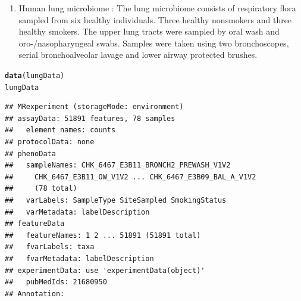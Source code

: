 \documentclass[a4paper,11pt]{article}\usepackage[]{graphicx}\usepackage[]{color}
\makeatletter
\newcommand{\hlstd}[1]{\textcolor[rgb]{0.345,0.345,0.345}{#1}}%
\newcommand{\hlkwd}[1]{\textcolor[rgb]{0.737,0.353,0.396}{\textbf{#1}}}%
\newenvironment{kframe}{%
 \def\at@end@of@kframe{}%
 \ifinner\ifhmode%
  \def\at@end@of@kframe{\end{minipage}}%
  \begin{minipage}{\columnwidth}%
 \fi\fi%
 \def\FrameCommand##1{\hskip\@totalleftmargin \hskip-\fboxsep
 \colorbox{shadecolor}{##1}\hskip-\fboxsep
     \hskip-\linewidth \hskip-\@totalleftmargin \hskip\columnwidth}%
 \MakeFramed {\advance\hsize-\width
   \@totalleftmargin\z@ \linewidth\hsize
   \@setminipage}}%
 {\par\unskip\endMakeFramed%
 \at@end@of@kframe}
\newenvironment{knitrout}{}{} %
\makeatother
\begin{document}
\begin{enumerate}
\item Human lung microbiome \cite{charlson}:
The lung microbiome consists of respiratory flora sampled from six healthy individuals. Three healthy nonsmokers and three healthy smokers. The upper lung tracts were sampled by oral wash and oro-/nasopharyngeal swabs. Samples were taken using two bronchoscopes, serial bronchoalveolar lavage and lower airway protected brushes.
\end{enumerate}
\begin{knitrout}
\color{fgcolor}\begin{kframe}
\begin{alltt}
\hlkwd{data}\hlstd{(lungData)}
\hlstd{lungData}
\end{alltt}
\begin{verbatim}
## MRexperiment (storageMode: environment)
## assayData: 51891 features, 78 samples 
##   element names: counts 
## protocolData: none
## phenoData
##   sampleNames: CHK_6467_E3B11_BRONCH2_PREWASH_V1V2
##     CHK_6467_E3B11_OW_V1V2 ... CHK_6467_E3B09_BAL_A_V1V2
##     (78 total)
##   varLabels: SampleType SiteSampled SmokingStatus
##   varMetadata: labelDescription
## featureData
##   featureNames: 1 2 ... 51891 (51891 total)
##   fvarLabels: taxa
##   fvarMetadata: labelDescription
## experimentData: use 'experimentData(object)'
##   pubMedIds: 21680950 
## Annotation:
\end{verbatim}
\end{kframe}
\end{knitrout}
\end{document}
